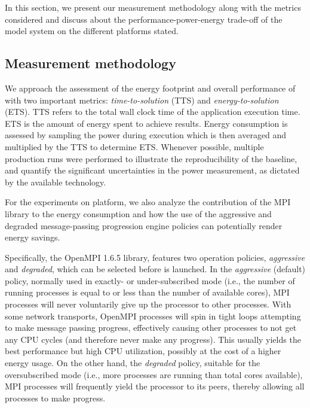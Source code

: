 In this section, we present our measurement methodology along with the
metrics  considered  and  discuss about  the  performance-power-energy
trade-off of the model system on the different platforms stated.

\subsection{Measurement methodology}
\label{subsec:4.1}

We  approach  the  assessment  of  the energy  footprint  and  overall
performance    of    \cosmoart    with    two    important    metrics:
\textit{time-to-solution} (TTS) and \textit{energy-to-solution} (ETS).
TTS refers to  the total wall clock time  of the application execution
time. ETS  is the amount of  energy spent to  achieve results.  Energy
consumption is  assessed by sampling the power  during execution which
is then averaged and multiplied  by the TTS to determine ETS. Whenever
possible, multiple  production runs  were performed to  illustrate the
reproducibility  of   the  baseline,  and   quantify  the  significant
uncertainties in  the power measurement, as dictated  by the available
technology.

For  the   experiments  on  \tinto  platform,  we   also  analyze  the
contribution of the MPI library  to the energy consumption and how the
use  of  the aggressive and degraded message-passing progression engine 
policies can potentially  render energy  savings.

Specifically,   the  OpenMPI 1.6.5  library,  features  two  operation 
policies, \emph{aggressive} and \emph{degraded}, which can be  selected 
before \cosmoart is launched. In the \emph{aggressive} (default) policy,  
normally used in exactly- or under-subscribed mode  (i.e., the  number 
of running processes is equal to or less than the number of  available 
cores), MPI processes will never voluntarily give up the processor  to 
other processes. With some network transports, OpenMPI processes  will 
spin  in  tight  loops  attempting  to  make message passing progress, 
effectively causing other processes to not get  any  CPU  cycles  (and  
therefore never make any  progress).  This  usually  yields  the  best 
performance but high CPU utilization, possibly at the cost of a higher 
energy usage.  On the other hand, the \emph{degraded} policy, suitable 
for the oversubscribed mode (i.e., more  processes  are  running  than 
total cores  available),  MPI  processes  will  frequently  yield  the 
processor to its peers, thereby allowing all processes to make progress. 

